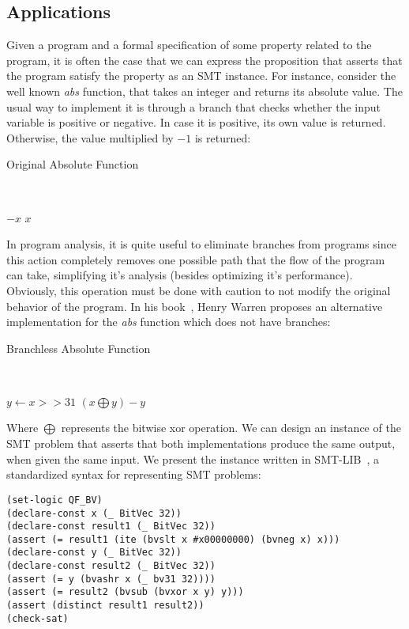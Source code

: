 \subsection{Applications}

Given a program and a formal specification of some property related to the program, it is often  the case that we can express the proposition that asserts that the program satisfy the property as an SMT instance. For instance, consider the well known \textit{abs} function, that takes an integer and returns its absolute value. The usual way to implement it is through a branch that checks whether the input variable is positive or negative. In case it is positive, its own value is returned. Otherwise, the value multiplied by $-1$ is returned:

\begin{algorithm}[H]
\caption{Original Absolute Function}~\label{originalAbs}
\begin{algorithmic}[1]
  \State\Return$-x$
\Else
  \State\Return$x$
\EndIf
\EndFunction
\end{algorithmic}
\end{algorithm}

In program analysis, it is quite useful to eliminate branches from programs since this action completely removes one possible path that the flow of the program can take, simplifying it's analysis (besides optimizing it's performance). Obviously, this operation must be done with caution to not modify the original behavior of the program. In his book~\cite{hacker_delight}, Henry Warren proposes an alternative implementation for the \textit{abs} function which does not have branches:

\begin{algorithm}[H]
\caption{Branchless Absolute Function}~\label{branchlessAbs}
\begin{algorithmic}[1]
  \State $y \gets x >> 31$
  \State \Return $(x \bigoplus y) - y$
\EndFunction
\end{algorithmic}
\end{algorithm}

Where $\bigoplus$ represents the bitwise xor operation. We can design an instance of the SMT problem that asserts that both implementations produce the same output, when given the same input. We present the instance written in SMT-LIB~\cite{smtlib}, a standardized syntax for representing SMT problems:

\begin{verbatim}
(set-logic QF_BV)
(declare-const x (_ BitVec 32))
(declare-const result1 (_ BitVec 32))
(assert (= result1 (ite (bvslt x #x00000000) (bvneg x) x)))
(declare-const y (_ BitVec 32))
(declare-const result2 (_ BitVec 32))
(assert (= y (bvashr x (_ bv31 32))))
(assert (= result2 (bvsub (bvxor x y) y)))
(assert (distinct result1 result2))
(check-sat)
\end{verbatim}

